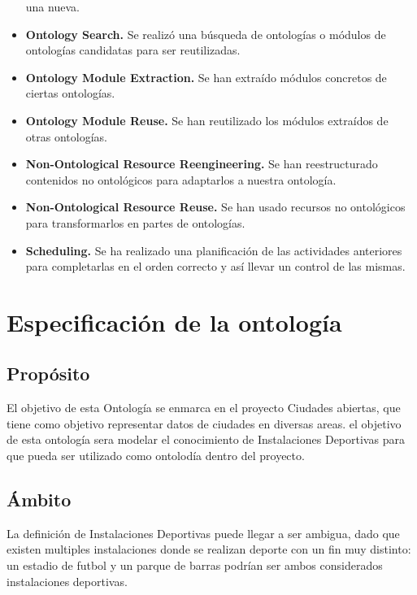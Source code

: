 \documentclass[a4paper,12pt]{article}
\begin{document}
\begin{itemize}
una nueva.
		\item \textbf{Ontology Search.} Se realizó una búsqueda de ontologías o módulos de ontologías
candidatas para ser reutilizadas.
		\item \textbf{Ontology Module Extraction.} Se han extraído módulos concretos de ciertas ontologías.
		\item \textbf{Ontology Module Reuse.} Se han reutilizado los módulos extraídos de otras ontologías.
		\item \textbf{Non-Ontological Resource Reengineering.} Se han reestructurado contenidos no
ontológicos para adaptarlos a nuestra ontología.
		\item \textbf{Non-Ontological Resource Reuse.} Se han usado recursos no ontológicos para
transformarlos en partes de ontologías.
		\item \textbf{Scheduling.} Se ha realizado una planificación de las actividades anteriores para
completarlas en el orden correcto y así llevar un control de las mismas.
	\end{itemize}
	
	\section{Especificación de la ontología}
	
	\subsection{Propósito}
	El objetivo de esta Ontología se enmarca en el proyecto Ciudades abiertas, que tiene como objetivo representar datos de ciudades en diversas areas. el objetivo de esta ontología sera modelar el conocimiento de Instalaciones Deportivas para que pueda ser utilizado como ontolodía dentro del proyecto.
	
	\subsection{Ámbito}
	La definición de Instalaciones Deportivas puede llegar a ser ambigua, dado que existen multiples instalaciones donde se realizan deporte con un fin muy distinto: un estadio de futbol y un parque de barras podrían ser ambos considerados instalaciones deportivas.
	
\end{document}
